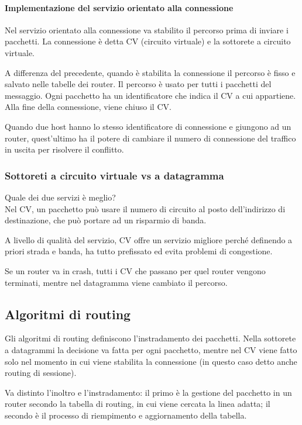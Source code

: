 \paragraph{Implementazione del servizio orientato alla connessione}
Nel servizio orientato alla connessione va stabilito il percorso prima di inviare i pacchetti.
La connessione è detta CV (circuito virtuale) e la sottorete a circuito virtuale.

A differenza del precedente, quando è stabilita la connessione il percorso è fisso e salvato nelle tabelle dei router.
Il percorso è usato per tutti i pacchetti del messaggio.
Ogni pacchetto ha un identificatore che indica il CV a cui appartiene. 
Alla fine della connessione, viene chiuso il CV.

Quando due host hanno lo stesso identificatore di connessione e giungono ad un router, quest'ultimo ha il potere di cambiare il numero di connessione del traffico in uscita per risolvere il conflitto.

\subsubsection{Sottoreti a circuito virtuale vs a datagramma}
Quale dei due servizi è meglio?\\
Nel CV, un pacchetto può usare il numero di circuito al posto dell'indirizzo di destinazione, che può portare ad un risparmio di banda.

A livello di qualità del servizio, CV offre un servizio migliore perché definendo a priori strada e banda, ha tutto prefissato ed evita problemi di congestione.

Se un router va in crash, tutti i CV che passano per quel router vengono terminati, mentre nel datagramma viene cambiato il percorso.

\subsection{Algoritmi di routing} %
Gli algoritmi di routing definiscono l'instradamento dei pacchetti.
Nella sottorete a datagrammi la decisione va fatta per ogni pacchetto, mentre nel CV viene fatto solo nel momento in cui viene stabilita la connessione (in questo caso detto anche routing di sessione).

Va distinto l'inoltro e l'instradamento:
il primo è la gestione del pacchetto in un router secondo la tabella di routing, in cui viene cercata la linea adatta; 
il secondo è il processo di riempimento e aggiornamento della tabella.

